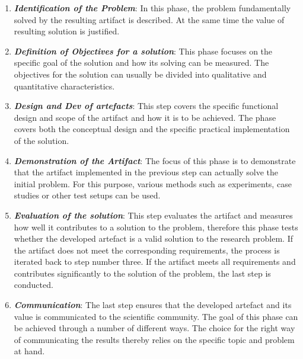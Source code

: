 \begin{enumerate}
    \item \textbf{\textit{Identification of the Problem}}: In this phase, the problem fundamentally solved by the resulting artifact is described. At the same time the value of resulting solution is justified. %
    \item \textbf{\textit{Definition of Objectives for a solution}}: This phase focuses on the specific goal of the solution and how its solving can be measured. The objectives for the solution can usually be divided into qualitative and quantitative characteristics. 
    \item \textbf{\textit{Design and Dev of artefacts}}: This step covers the specific functional design and scope of the artifact and how it is to be achieved. The phase covers both the conceptual design and the specific practical implementation of the solution.
    \item \textbf{\textit{Demonstration of the Artifact}}: The focus of this phase is to demonstrate that the artifact implemented in the previous step can actually solve the initial problem. For this purpose, various methods such as experiments, case studies or other test setups can be used.
    \item \textbf{\textit{Evaluation of the solution}}: This step evaluates the artifact and measures how well it contributes to a solution to the problem, therefore this phase tests whether the developed artefact is a valid solution to the research problem. If the artifact does not meet the corresponding requirements, the process is iterated back to step number three. If the artifact meets all requirements and contributes significantly to the solution of the problem, the last step is conducted. 
    \item \textbf{\textit{Communication}}: The last step ensures that the developed artefact and its value is communicated to the scientific community. The goal of this phase can be achieved through a number of different ways. The choice for the right way of communicating the results thereby relies on the specific topic and problem at hand.
\end{enumerate}




